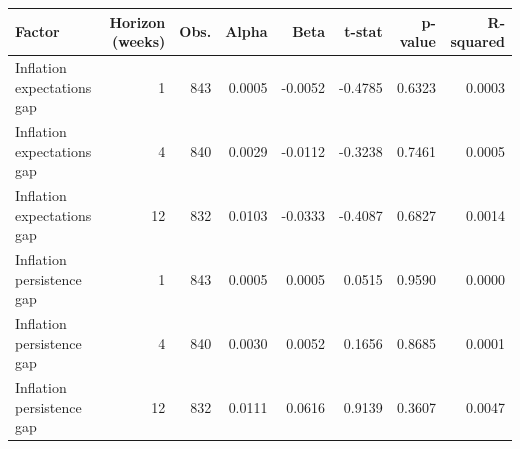 \begin{tabular}{lrrrrrrr}
\toprule
Factor & Horizon (weeks) & Obs. & Alpha & Beta & t-stat & p-value & R-squared \\
\midrule
Inflation expectations gap & 1 & 843 & 0.0005 & -0.0052 & -0.4785 & 0.6323 & 0.0003 \\
Inflation expectations gap & 4 & 840 & 0.0029 & -0.0112 & -0.3238 & 0.7461 & 0.0005 \\
Inflation expectations gap & 12 & 832 & 0.0103 & -0.0333 & -0.4087 & 0.6827 & 0.0014 \\
Inflation persistence gap & 1 & 843 & 0.0005 & 0.0005 & 0.0515 & 0.9590 & 0.0000 \\
Inflation persistence gap & 4 & 840 & 0.0030 & 0.0052 & 0.1656 & 0.8685 & 0.0001 \\
Inflation persistence gap & 12 & 832 & 0.0111 & 0.0616 & 0.9139 & 0.3607 & 0.0047 \\
\bottomrule
\end{tabular}
